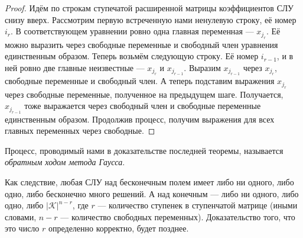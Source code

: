 \begin{proof}
    Идём по строкам ступечатой расширенной матрицы коэффициентов СЛУ снизу вверх. Рассмотрим первую встреченную нами ненулевую строку, её номер $i_r$. В соответствующем уравнении ровно одна главная переменная --- $x_{j_r}$. Её можно выразить через свободные переменные и свободный член уравнения единственным образом. Теперь возьмём следующую строку. Её номер $i_{r - 1}$, и в ней ровно две главные неизвестные --- $x_{j_r}$ и $x_{j_{r - 1}}$. Выразим $x_{j_{r - 1}}$ через $x_{j_r}$, свободные переменные и свободный член. А теперь подставим выражения $x_{j_r}$ через свободные переменные, полученное на предыдущем шаге. Получается, $x_{j_{r - 1}}$ тоже выражается через свободный член и свободные переменные единственным образом. Продолжив процесс, получим выражения для всех главных переменных через свободные.
\end{proof}

Процесс, проводимый нами в доказательстве последней теоремы, называется \textit{обратным ходом метода Гаусса}.

\begin{remark}
    Как следствие, любая СЛУ над бесконечным полем имеет либо ни одного, либо одно, либо бесконечно много решений. А над конечным --- либо ни одного, либо одно, либо $|\mathcal{K}|^{n - r}$, где $r$ --- количество ступенек в ступенчатой матрице (иными словами, $n - r$ --- количество свободных переменных). Доказательство того, что это число $r$ определенно корректно, будет позднее.
\end{remark}


